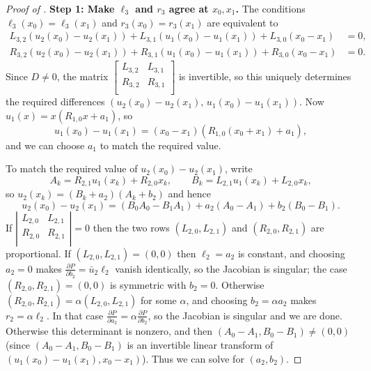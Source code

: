 \begin{proof}[Proof of ]
\smallskip
\noindent\textbf{Step 1: Make $\ell_3$ and $r_3$ agree at $x_0,x_1$.}
The conditions $\ell_3(x_0)=\ell_3(x_1)$ and $r_3(x_0)=r_3(x_1)$ are equivalent to
\begin{align}
   L_{3,2} (u_2(x_0)-u_2(x_1)) + L_{3,1} (u_1(x_0)-u_1(x_1)) + L_{3,0}(x_0-x_1) &= 0, \\
   R_{3,2} (u_2(x_0)-u_2(x_1)) + R_{3,1} (u_1(x_0)-u_1(x_1)) + R_{3,0}(x_0-x_1) &= 0.
\end{align}
Since $D\neq 0$, the matrix
\(
\begin{bmatrix}
   L_{3,2} & L_{3,1} \\
   R_{3,2} & R_{3,1} \\
\end{bmatrix}
\)
is invertible, so this uniquely determines the required differences
$(u_2(x_0)-u_2(x_1),\,u_1(x_0)-u_1(x_1))$.
Now $u_1(x)=x(R_{1,0}x+a_1)$, so
\[
   u_1(x_0)-u_1(x_1) = (x_0-x_1)(R_{1,0}(x_0+x_1)+a_1),
\]
and we can choose $a_1$ to match the required value.

To match the required value of $u_2(x_0)-u_2(x_1)$, write
\[
   A_k = R_{2,1}u_1(x_k)+R_{2,0}x_k,\qquad
   B_k = L_{2,1}u_1(x_k)+L_{2,0}x_k,
\]
so $u_2(x_k)=(B_k+a_2)(A_k+b_2)$ and hence
\[
   u_2(x_0)-u_2(x_1)
   = (B_0A_0-B_1A_1) + a_2(A_0-A_1) + b_2(B_0-B_1).
\]
If
\(
   \left|
   \begin{matrix}
      L_{2,0} & L_{2,1} \\
      R_{2,0} & R_{2,1} \\
   \end{matrix}
   \right|
   = 0
\)
then the two rows $(L_{2,0},L_{2,1})$ and $(R_{2,0},R_{2,1})$ are proportional.
If $(L_{2,0},L_{2,1})=(0,0)$ then $\ell_2=a_2$ is constant, and choosing $a_2=0$ makes $\frac{\partial P}{\partial b_2}=\bar u_2\ell_2$ vanish identically, so the Jacobian is singular; the case $(R_{2,0},R_{2,1})=(0,0)$ is symmetric with $b_2=0$.
Otherwise $(R_{2,0},R_{2,1})=\alpha(L_{2,0},L_{2,1})$ for some $\alpha$, and choosing $b_2=\alpha a_2$ makes $r_2=\alpha \ell_2$.
In that case $\frac{\partial P}{\partial a_2}=\alpha \frac{\partial P}{\partial b_2}$, so the Jacobian is singular and we are done.
Otherwise this determinant is nonzero, and then $(A_0-A_1,B_0-B_1)\neq (0,0)$ (since $(A_0-A_1,B_0-B_1)$ is an invertible linear transform of $(u_1(x_0)-u_1(x_1),x_0-x_1)$).
Thus we can solve for $(a_2,b_2)$.


\end{proof}
